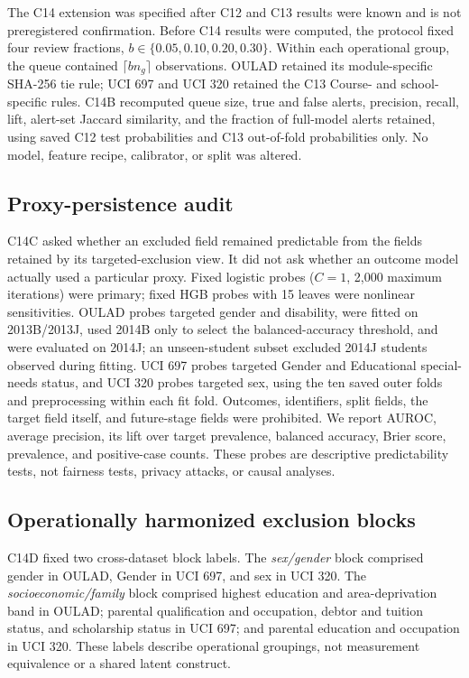 \documentclass[11pt]{article}
\begin{document}
The C14 extension was specified after C12 and C13 results were known and is not preregistered confirmation. Before C14 results were computed, the protocol fixed four review fractions, $b\in\{0.05,0.10,0.20,0.30\}$. Within each operational group, the queue contained $\lceil b n_g\rceil$ observations. OULAD retained its module-specific SHA-256 tie rule; UCI 697 and UCI 320 retained the C13 Course- and school-specific rules. C14B recomputed queue size, true and false alerts, precision, recall, lift, alert-set Jaccard similarity, and the fraction of full-model alerts retained, using saved C12 test probabilities and C13 out-of-fold probabilities only. No model, feature recipe, calibrator, or split was altered.

\subsection{Proxy-persistence audit}

C14C asked whether an excluded field remained predictable from the fields retained by its targeted-exclusion view. It did not ask whether an outcome model actually used a particular proxy. Fixed logistic probes ($C=1$, 2,000 maximum iterations) were primary; fixed HGB probes with 15 leaves were nonlinear sensitivities. OULAD probes targeted gender and disability, were fitted on 2013B/2013J, used 2014B only to select the balanced-accuracy threshold, and were evaluated on 2014J; an unseen-student subset excluded 2014J students observed during fitting. UCI 697 probes targeted Gender and Educational special-needs status, and UCI 320 probes targeted sex, using the ten saved outer folds and preprocessing within each fit fold. Outcomes, identifiers, split fields, the target field itself, and future-stage fields were prohibited. We report AUROC, average precision, its lift over target prevalence, balanced accuracy, Brier score, prevalence, and positive-case counts. These probes are descriptive predictability tests, not fairness tests, privacy attacks, or causal analyses.

\subsection{Operationally harmonized exclusion blocks}

C14D fixed two cross-dataset block labels. The \emph{sex/gender} block comprised gender in OULAD, Gender in UCI 697, and sex in UCI 320. The \emph{socioeconomic/family} block comprised highest education and area-deprivation band in OULAD; parental qualification and occupation, debtor and tuition status, and scholarship status in UCI 697; and parental education and occupation in UCI 320. These labels describe operational groupings, not measurement equivalence or a shared latent construct.
\end{document}
